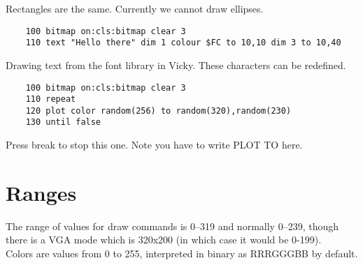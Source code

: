 Rectangles are the same. Currently we cannot draw ellipses.

\begin{verbatim}
	100 bitmap on:cls:bitmap clear 3
	110 text "Hello there" dim 1 colour $FC to 10,10 dim 3 to 10,40
\end{verbatim}

Drawing text from the font library in Vicky. These characters can be redefined.

\begin{verbatim}
	100 bitmap on:cls:bitmap clear 3
	110 repeat
	120 plot color random(256) to random(320),random(230)
	130 until false
\end{verbatim}

Press break to stop this one. Note you have to write PLOT TO here.

\section{Ranges}

The range of values for draw commands is 0–319 and normally 0–239, though there is a VGA mode which is 320x200 (in which case it would be 0-199).\\

Colors are values from 0 to 255, interpreted in binary as RRRGGGBB by default.
